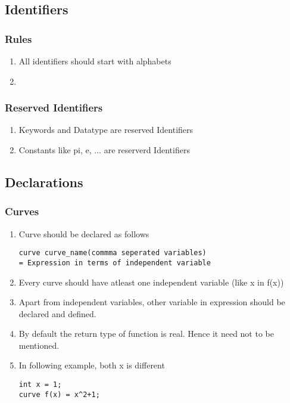 \documentclass[12pt]{article}
\begin{document}
    \subsection{Identifiers}
    \subsubsection{Rules}
    \begin{enumerate}
        \item All identifiers should start with alphabets
        \item 
    \end{enumerate}
    \subsubsection{Reserved Identifiers}
    \begin{enumerate}
        \item Keywords and Datatype are reserved Identifiers
        \item Constants like pi, e, ... are reserverd Identifiers
    \end{enumerate}
    \subsection{Declarations}
    \subsubsection{Curves}
    \begin{enumerate}
        \item Curve should be declared as follows
        \begin{verbatim}
curve curve_name(commma seperated variables) 
= Expression in terms of independent variable
        \end{verbatim}
        \item Every curve should have atleast one independent variable (like x in f(x))
        \item Apart from independent variables, other variable in expression should be declared and defined.
        \item By default the return type of function is real. Hence it need not to be mentioned.
        \item In following example, both x is different
        \begin{verbatim}
int x = 1;
curve f(x) = x^2+1;
        \end{verbatim}
    \end{enumerate}
\end{document}
